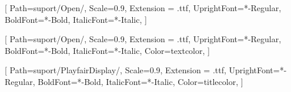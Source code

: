 \usepackage{geometry}
\usepackage{xcolor}
\usepackage{eso-pic}
\usepackage{fancyhdr}
\usepackage{sectsty}
\usepackage{fontspec}
\usepackage{titlesec}
\usepackage{graphicx}
\usepackage{ragged2e}
\usepackage{tikz}
\usepackage{wallpaper}
\usepackage{hyperref}
\usepackage{pdflscape}
\usepackage{everypage}








\setsansfont{OpenSans}[
  Path=suport/Open/,
  Scale=0.9,
  Extension = .ttf,
  UprightFont=*-Regular,
  BoldFont=*-Bold,
  ItalicFont=*-Italic,
]

\setmainfont{OpenSans}[
  Path=suport/Open/,
  Scale=0.9,
  Extension = .ttf,
  UprightFont=*-Regular,
  BoldFont=*-Bold,
  ItalicFont=*-Italic,
  Color=textcolor,
]

\newfontfamily{}[
  Path=suport/PlayfairDisplay/,
  Scale=0.9,
  Extension = .ttf,
  UprightFont=*-Regular,
  BoldFont=*-Bold,
  ItalicFont=*-Italic,
  Color=titlecolor,
]

\chapterfont{\color{dark}\fontsize{16}{16.8}\playfair} %
\sectionfont{\color{dark}\fontsize{14}{14.8}\playfair} %
\subsectionfont{\color{dark}\fontsize{12}{12.8}\playfair} %
\subsubsectionfont{\color{dark}\fontsize{11}{11.8}\playfair} %

\setcounter{secnumdepth}{3}

